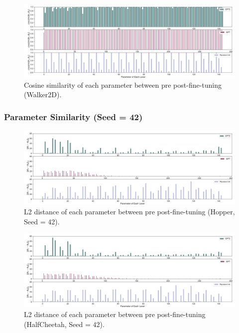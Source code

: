 \documentclass{article}
\begin{document}
\begin{figure}[H]
    \centering
        \includegraphics[width=\linewidth]{figs/paramcos_0_40_gpt2_igpt_dt_walker2d_medium_666.pdf}
    \caption{Cosine similarity of each parameter between pre post-fine-tuning (Walker2D).}
\end{figure}

\subsubsection{Parameter Similarity (Seed = 42)}

\begin{figure}[H]
    \centering
        \includegraphics[width=\linewidth]{figs/paramdist_0_40_gpt2_igpt_dt_hopper_medium_42.pdf}
    \caption{L2 distance of each parameter between pre post-fine-tuning (Hopper, Seed = 42).}
\end{figure}

\begin{figure}[H]
    \centering
        \includegraphics[width=\linewidth]{figs/paramdist_0_40_gpt2_igpt_dt_halfcheetah_medium_42.pdf}
    \caption{L2 distance of each parameter between pre post-fine-tuning (HalfCheetah, Seed = 42).}
\end{figure}
\end{document}

